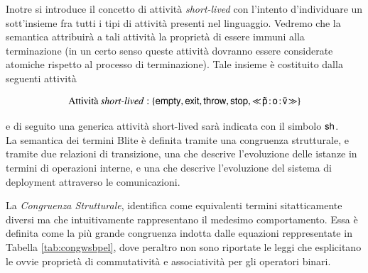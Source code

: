 Inotre si introduce il concetto di attività \emph{short-lived} con l'intento
d'individuare un sott'insieme fra tutti i tipi di attività presenti nel
linguaggio. Vedremo che la semantica attribuirà a tali attività la proprietà di
essere immuni alla terminazione (in un certo senso queste attività
dovranno essere considerate atomiche rispetto al processo di terminazione).
Tale insieme è costituito dalla seguenti attività

$$
\textrm{Attività \emph{short-lived}} : \{ {\sf empty}, {\sf exit},
{\sf throw}, {\sf stop}, \ll\!\tilde{{\sf p}}\! : \! {\sf o}\! : \! \bar{{\sf v}}\!\gg \}
$$

e di seguito una generica attività short-lived sarà indicata con
il simbolo ${\sf sh}$.
\\

La semantica dei termini Blite è definita tramite una congruenza strutturale, e
tramite due relazioni di transizione, una che descrive l'evoluzione delle
istanze in termini di operazioni interne, e una che descrive l'evoluzione del sistema
di deployment attraverso le comunicazioni. 

La \emph{Congruenza Strutturale}, identifica come equivalenti termini
sitatticamente diversi ma che intuitivamente rappresentano il medesimo
comportamento. Essa è definita come la più grande congruenza indotta dalle
equazioni reppresentate in Tabella \ref{tab:congwsbpel}, dove peraltro non sono
riportate le leggi che esplicitano le ovvie proprietà di
commutatività e associatività per gli operatori binari.


